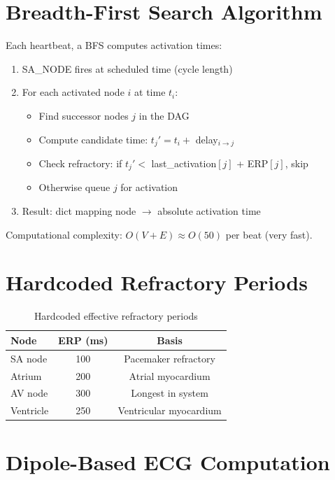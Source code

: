 \documentclass[12pt,oneside,a4paper]{book}
\begin{document}
\section{Breadth-First Search Algorithm}

Each heartbeat, a BFS computes activation times:

\begin{enumerate}
  \item SA\_NODE fires at scheduled time (cycle length)
  \item For each activated node $i$ at time $t_i$:
    \begin{itemize}
      \item Find successor nodes $j$ in the DAG
      \item Compute candidate time: $t_j' = t_i +$ delay$_{i \to j}$
      \item Check refractory: if $t_j' <$ last\_activation$[j]$ + ERP$[j]$, skip
      \item Otherwise queue $j$ for activation
    \end{itemize}
  \item Result: dict mapping node $\to$ absolute activation time
\end{enumerate}

Computational complexity: $O(V + E) \approx O(50)$ per beat (very fast).

\section{Hardcoded Refractory Periods}

\begin{table}[htb]
\centering
\begin{tabularx}{\textwidth}{|l|c|c|}
\hline
\textbf{Node} & \textbf{ERP (ms)} & \textbf{Basis} \\
\hline
SA node & 100 & Pacemaker refractory \\
Atrium & 200 & Atrial myocardium \\
AV node & 300 & Longest in system \\
Ventricle & 250 & Ventricular myocardium \\
\hline
\end{tabularx}
\caption{Hardcoded effective refractory periods}
\label{tab:erp}
\end{table}

\section{Dipole-Based ECG Computation}
\end{document}
